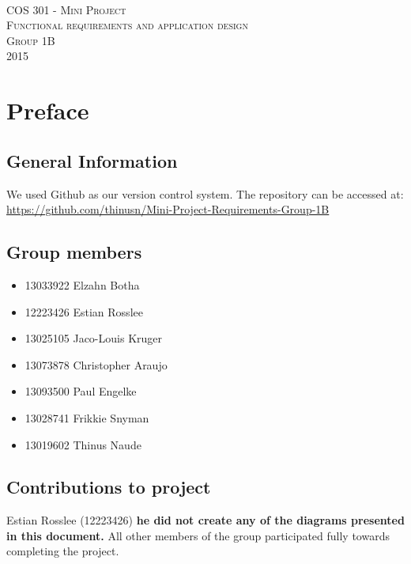 \documentclass [a4paper,12pt] {article}
\begin{document}
\begin{titlepage}
	\begin{center}
		\textsc{\huge\\[5cm] COS 301 - Mini Project}\\[1cm]
		\textsc{\huge Functional requirements and application design}\\[1cm]
		\textsc{\huge Group 1B}\\[1cm]
		\textsc{\large 2015}
	\end{center}
\end{titlepage}
\tableofcontents
\pagebreak
\section{Preface}
	\subsection{General Information}
	We used Github as our version control system. The repository can be accessed at: \linebreak \url{https://github.com/thinusn/Mini-Project-Requirements-Group-1B}
	\subsection{Group members}
	\begin{itemize}
		\item 13033922 Elzahn Botha
		\item 12223426 Estian Rosslee
		\item 13025105 Jaco-Louis Kruger
		\item 13073878 Christopher Araujo
		\item 13093500 Paul Engelke
		\item 13028741 Frikkie Snyman
		\item 13019602 Thinus Naude
	\end{itemize}
	\subsection{Contributions to project} 
		Estian Rosslee (12223426) \textbf{he did not create any of the diagrams presented in this document.} All other members of the group participated fully towards completing the project.
\end{document}
